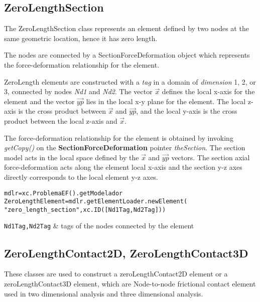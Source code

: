 \subsection{ZeroLengthSection}
The ZeroLengthSection class represents an element defined by two nodes at the same geometric location, hence it has zero length.

The nodes are connected by a SectionForceDeformation object which represents the force-deformation relationship for the element. 

ZeroLength elements are constructed with a {\em tag} in a domain of {\em dimension} 1, 2, or 3, connected by nodes {\em Nd1} and {\em Nd2}. 
The vector $\vec{x}$ defines the local x-axis for the element and the vector $\vec{yp}$ lies in the local x-y plane for the element.  The local z-axis is the cross product between $\vec{x}$ and $\vec{yp}$, and the local y-axis is the cross product between the local z-axis and $\vec{x}$.

The force-deformation relationship for the element is obtained by invoking {\em getCopy()} on the {\bf SectionForceDeformation} pointer {\em theSection}. The section model acts in the local space defined by the $\vec{x}$ and $\vec{yp}$ vectors. The section axial force-deformation acts along the element local x-axis and the section y-z axes directly corresponds to the local element y-z axes.

\begin{verbatim}
mdlr=xc.ProblemaEF().getModelador
ZeroLengthElement=mdlr.getElementLoader.newElement(
"zero_length_section",xc.ID([Nd1Tag,Nd2Tag]))
\end{verbatim}
\begin{paramFuncTable}
{\tt Nd1Tag,Nd2Tag} & tags of the nodes connected by the element\\
\end{paramFuncTable}

\begin{paramClassTable}
\ElementParam{}
\ElementZERODParam{}
\end{paramClassTable}

\begin{methodsTable}
\ElementMeth{}
\ElementZERODMeth{}
\ZeroLengthSectionMeth{}
\end{methodsTable}


\subsection{ZeroLengthContact2D, ZeroLengthContact3D}
These classes are used to construct a zeroLengthContact2D element or a zeroLengthContact3D element, which are Node-to-node frictional contact element used in two dimensional analysis and three dimensional analysis.

